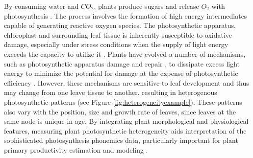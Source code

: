 \documentclass{bioinfo}
\begin{document}
By consuming water and $CO_2$, plants produce sugars and release $O_2$ with photosynthesis \citep{kramer2011importance}. The process involves the formation of high energy intermediates capable of generating reactive oxygen species. The photosynthetic apparatus, chloroplast and surrounding leaf tissue is inherently susceptible to oxidative damage, especially under stress conditions when the supply of light energy exceeds the capacity to utilize it \citep{durrant1990characterisation,asada1996radical}. Plants have evolved a number of mechanisms, such as photosynthetic apparatus damage and repair \citep{melis1999photosystem}, to dissipate excess light energy to minimize the potential for damage at the expense of photosynthetic efficiency \citep{adams2006energy,rochaix2014regulation}. However, these mechanisms are sensitive to leaf development and thus may change from one leave tissue to another, resulting in heterogenous photosynthetic patterns (see Figure \ref{fig:heterogeneityexample}). These patterns also vary with the position, size and growth rate of leaves, since leaves at the same node is unique in age. By integrating plant morphological and physiological features, measuring plant photosynthetic heterogeneity aids interpretation of the sophisticated photosynthesis phonemics data, particularly important for plant primary productivity estimation and modeling \citep{meng2007spatial}.
\end{document}
